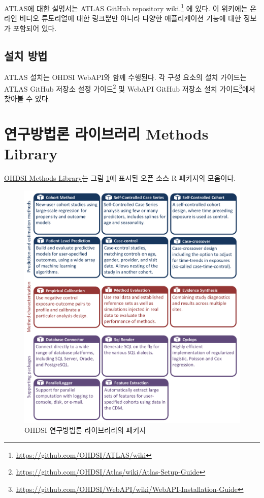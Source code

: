 \documentclass[10.5pt]{book}
\let\rmarkdownfootnote\footnote%
\def\footnote{\protect\rmarkdownfootnote}
\theoremstyle{definition}
\theoremstyle{definition}
\theoremstyle{definition}
\theoremstyle{remark}
\begin{document}
ATLAS에 대한 설명서는 ATLAS GitHub repository wiki.\footnote{\url{https://github.com/OHDSI/ATLAS/wiki}}
에 있다. 이 위키에는 온라인 비디오 튜토리얼에 대한 링크뿐만 아니라
다양한 애플리케이션 기능에 대한 정보가 포함되어 있다.

\subsection{설치 방법}\label{-}

ATLAS 설치는 OHDSI WebAPI와 함께 수행된다. 각 구성 요소의 설치 가이드는
ATLAS GitHub 저장소 설정 가이드\footnote{\url{https://github.com/OHDSI/Atlas/wiki/Atlas-Setup-Guide}}
및 WebAPI GitHub 저장소 설치 가이드\footnote{\url{https://github.com/OHDSI/WebAPI/wiki/WebAPI-Installation-Guide}}에서
찾아볼 수 있다. 

\section{연구방법론 라이브러리 Methods Library}\label{--methods-library}

\href{https://ohdsi.github.io/MethodsLibrary/}{OHDSI Methods Library}는
그림 \ref{fig:methodsLibrary}에 표시된 오픈 소스 R 패키지의 모음이다.

\begin{figure}

{\centering \includegraphics[width=1\linewidth]{images/OhdsiAnalyticsTools/methodsLibrary} 

}

\caption{OHDSI 연구방법론 라이브러리의 패키지}\label{fig:methodsLibrary}
\end{figure}
\end{document}
